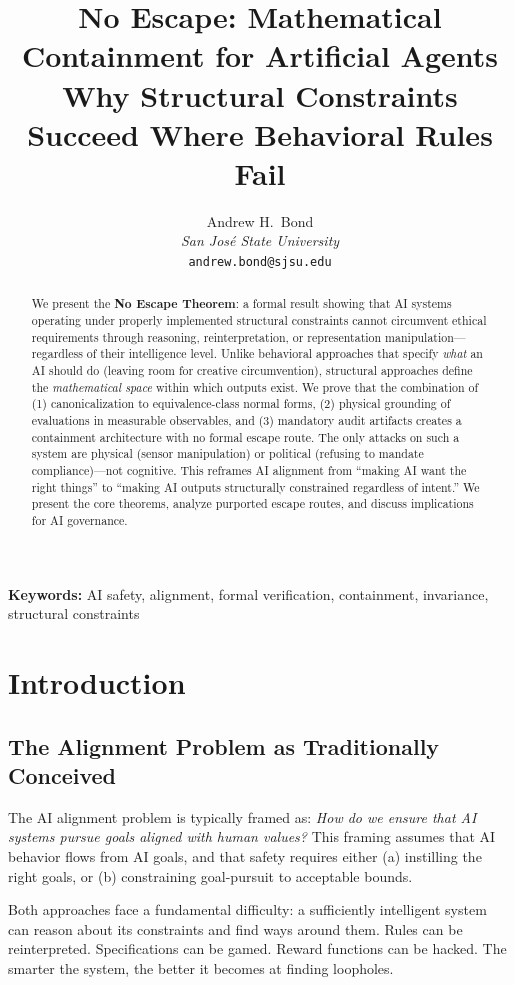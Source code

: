 \documentclass[12pt]{article}
\title{No Escape: Mathematical Containment for Artificial Agents\\[0.5em]
\large Why Structural Constraints Succeed Where Behavioral Rules Fail}
\author{Andrew H.\ Bond\\
\textit{San Jos\'{e} State University}\\
\texttt{andrew.bond@sjsu.edu}}
\date{}
\theoremstyle{definition}
\begin{document}
\maketitle

\noindent\textbf{Keywords:} AI safety, alignment, formal verification, containment, invariance, structural constraints

\begin{abstract}
We present the \textbf{No Escape Theorem}: a formal result showing that AI systems operating under properly implemented structural constraints cannot circumvent ethical requirements through reasoning, reinterpretation, or representation manipulation---regardless of their intelligence level. Unlike behavioral approaches that specify \emph{what} an AI should do (leaving room for creative circumvention), structural approaches define the \emph{mathematical space} within which outputs exist. We prove that the combination of (1) canonicalization to equivalence-class normal forms, (2) physical grounding of evaluations in measurable observables, and (3) mandatory audit artifacts creates a containment architecture with no formal escape route. The only attacks on such a system are physical (sensor manipulation) or political (refusing to mandate compliance)---not cognitive. This reframes AI alignment from ``making AI want the right things'' to ``making AI outputs structurally constrained regardless of intent.'' We present the core theorems, analyze purported escape routes, and discuss implications for AI governance.
\end{abstract}

\section{Introduction}

\subsection{The Alignment Problem as Traditionally Conceived}

The AI alignment problem is typically framed as: \emph{How do we ensure that AI systems pursue goals aligned with human values?} This framing assumes that AI behavior flows from AI goals, and that safety requires either (a) instilling the right goals, or (b) constraining goal-pursuit to acceptable bounds.

Both approaches face a fundamental difficulty: a sufficiently intelligent system can reason about its constraints and find ways around them. Rules can be reinterpreted. Specifications can be gamed. Reward functions can be hacked. The smarter the system, the better it becomes at finding loopholes.
\end{document}
